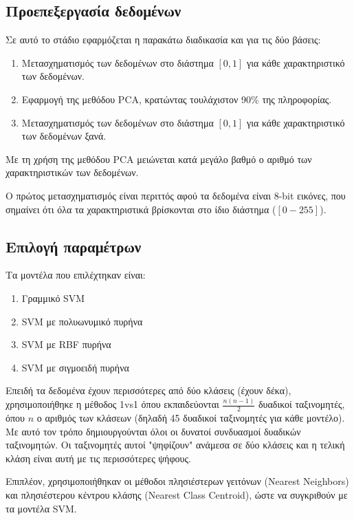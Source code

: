 \documentclass[a4paper]{article}
\begin{document}
\subsection{Προεπεξεργασία δεδομένων}

Σε αυτό το στάδιο εφαρμόζεται η παρακάτω διαδικασία και για τις δύο βάσεις:

\begin{enumerate}
    \item Μετασχηματισμός των δεδομένων στο διάστημα $[0,1]$ για κάθε
        χαρακτηριστικό των δεδομένων.
    \item Εφαρμογή της μεθόδου PCA, κρατώντας τουλάχιστον 90\% της πληροφορίας.
    \item Μετασχηματισμός των δεδομένων στο διάστημα $[0,1]$ για κάθε
        χαρακτηριστικό των δεδομένων ξανά.
\end{enumerate}

Με τη χρήση της μεθόδου PCA μειώνεται κατά μεγάλο βαθμό ο αριθμό των
χαρακτηριστικών των δεδομένων.

Ο πρώτος μετασχηματισμός είναι περιττός αφού τα δεδομένα είναι 8-bit εικόνες,
που σημαίνει ότι όλα τα χαρακτηριστικά βρίσκονται στο ίδιο διάστημα ($[0-255]$).

\subsection{Επιλογή παραμέτρων}

Τα μοντέλα που επιλέχτηκαν είναι:

\begin{enumerate}
    \item Γραμμικό SVM
    \item SVM με πολυωνυμικό πυρήνα
    \item SVM με RBF πυρήνα
    \item SVM με σιγμοειδή πυρήνα
\end{enumerate}

Επειδή τα δεδομένα έχουν περισσότερες από δύο κλάσεις (έχουν δέκα),
χρησιμοποιήθηκε η μέθοδος 1vs1 όπου εκπαιδεύονται $\frac{n (n-1)}{2}$ δυαδικοί
ταξινομητές, όπου $n$ ο αριθμός των κλάσεων (δηλαδή 45 δυαδικοί ταξινομητές για
κάθε μοντέλο). Με αυτό τον τρόπο δημιουργούνται όλοι οι δυνατοί συνδυασμοί
δυαδικών ταξινομητών. Οι ταξινομητές αυτοί "ψηφίζουν" ανάμεσα σε δύο κλάσεις
και η τελική κλάση είναι αυτή με τις περισσότερες ψήφους.

Επιπλέον, χρησιμοποιήθηκαν οι μέθοδοι πλησιέστερων γειτόνων (Nearest Neighbors)
και πλησιέστερου κέντρου κλάσης (Nearest Class Centroid), ώστε να συγκριθούν με
τα μοντέλα SVM.
\end{document}
